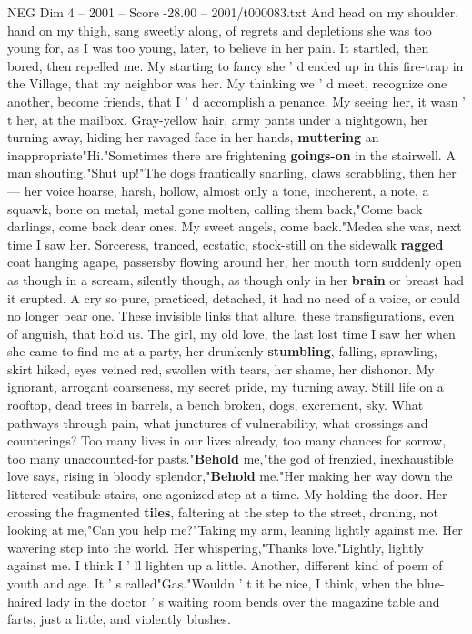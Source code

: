 \begin{textsample}{NEG Dim 4 – 2001 – Score -28.00 – 2001/t000083.txt}
And head on my shoulder, hand on my thigh, sang sweetly along, of regrets and depletions she was too young for, as I was too young, later, to believe in her pain.
It startled, then bored, then repelled me.
My starting to fancy she ' d ended up in this fire-trap in the Village, that my neighbor was her.
My thinking we ' d meet, recognize one another, become friends, that I ' d accomplish a penance.
My seeing her, it wasn ' t her, at the mailbox.
Gray-yellow hair, army pants under a nightgown, her turning away, hiding her ravaged face in her hands, \textbf{muttering} an inappropriate"Hi."Sometimes there are frightening \textbf{goings-on} in the stairwell.
A man shouting,"Shut up!"The dogs frantically snarling, claws scrabbling, then her — her voice hoarse, harsh, hollow, almost only a tone, incoherent, a note, a squawk, bone on metal, metal gone molten, calling them back,"Come back darlings, come back dear ones.
My sweet angels, come back."Medea she was, next time I saw her.
Sorceress, tranced, ecstatic, stock-still on the sidewalk \textbf{ragged} coat hanging agape, passersby flowing around her, her mouth torn suddenly open as though in a scream, silently though, as though only in her \textbf{brain} or breast had it erupted.
A cry so pure, practiced, detached, it had no need of a voice, or could no longer bear one.
These invisible links that allure, these transfigurations, even of anguish, that hold us.
The girl, my old love, the last lost time I saw her when she came to find me at a party, her drunkenly \textbf{stumbling}, falling, sprawling, skirt hiked, eyes veined red, swollen with tears, her shame, her dishonor.
My ignorant, arrogant coarseness, my secret pride, my turning away.
Still life on a rooftop, dead trees in barrels, a bench broken, dogs, excrement, sky.
What pathways through pain, what junctures of vulnerability, what crossings and counterings?
Too many lives in our lives already, too many chances for sorrow, too many unaccounted-for pasts."\textbf{Behold} me,"the god of frenzied, inexhaustible love says, rising in bloody splendor,"\textbf{Behold} me."Her making her way down the littered vestibule stairs, one agonized step at a time.
My holding the door.
Her crossing the fragmented \textbf{tiles}, faltering at the step to the street, droning, not looking at me,"Can you help me?"Taking my arm, leaning lightly against me.
Her wavering step into the world.
Her whispering,"Thanks love."Lightly, lightly against me.
I think I ' ll lighten up a little.
Another, different kind of poem of youth and age.
It ' s called"Gas."Wouldn ' t it be nice, I think, when the blue-haired lady in the doctor ' s waiting room bends over the magazine table and farts, just a little, and violently blushes.

\end{textsample}
